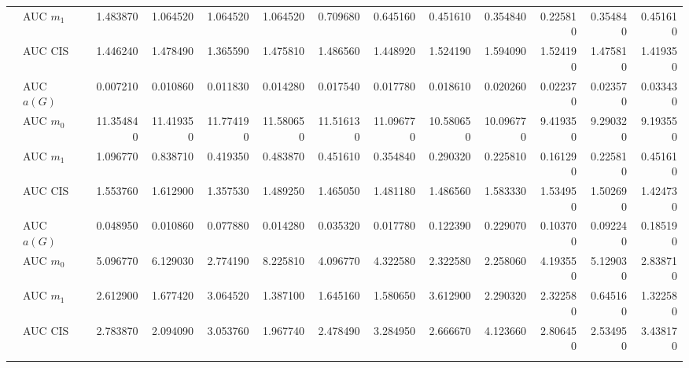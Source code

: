 \begin{table}[htbp]
\begin{tabular}{llrrrrrrrrrrr}
    & AUC $m_1$ & 1.483870 & 1.064520 & 1.064520 & 1.064520 & 0.709680 & 0.645160 & 0.451610 & 0.354840 & 0.225810 & 0.354840 & 0.451610 \\
    & AUC CIS & 1.446240 & 1.478490 & 1.365590 & 1.475810 & 1.486560 & 1.448920 & 1.524190 & 1.594090 & 1.524190 & 1.475810 & 1.419350 \\
    \addlinespace
    \multirow{4}{*}{degree} & AUC $a(G)$ & 0.007210 & 0.010860 & 0.011830 & 0.014280 & 0.017540 & 0.017780 & 0.018610 & 0.020260 & 0.022370 & 0.023570 & 0.033430 \\
    & AUC $m_0$ & 11.354840 & 11.419350 & 11.774190 & 11.580650 & 11.516130 & 11.096770 & 10.580650 & 10.096770 & 9.419350 & 9.290320 & 9.193550 \\
    & AUC $m_1$ & 1.096770 & 0.838710 & 0.419350 & 0.483870 & 0.451610 & 0.354840 & 0.290320 & 0.225810 & 0.161290 & 0.225810 & 0.451610 \\
    & AUC CIS & 1.553760 & 1.612900 & 1.357530 & 1.489250 & 1.465050 & 1.481180 & 1.486560 & 1.583330 & 1.534950 & 1.502690 & 1.424730 \\
    \addlinespace
    \multirow{4}{*}{random} & AUC $a(G)$ & 0.048950 & 0.010860 & 0.077880 & 0.014280 & 0.035320 & 0.017780 & 0.122390 & 0.229070 & 0.103700 & 0.092240 & 0.185190 \\
    & AUC $m_0$ & 5.096770 & 6.129030 & 2.774190 & 8.225810 & 4.096770 & 4.322580 & 2.322580 & 2.258060 & 4.193550 & 5.129030 & 2.838710 \\
    & AUC $m_1$ & 2.612900 & 1.677420 & 3.064520 & 1.387100 & 1.645160 & 1.580650 & 3.612900 & 2.290320 & 2.322580 & 0.645160 & 1.322580 \\
    & AUC CIS & 2.783870 & 2.094090 & 3.053760 & 1.967740 & 2.478490 & 3.284950 & 2.666670 & 4.123660 & 2.806450 & 2.534950 & 3.438170 \\
    \addlinespace
    \bottomrule
  \end{tabular}
\end{table}

